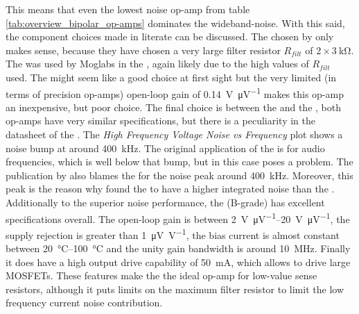This means that even the lowest noise op-amp from table \ref{tab:overview_bipolar_op-amps} dominates the wideband-noise. With this said, the component choices made in literate can be discussed. The  chosen by \citeauthor{laser_driver_digital} \cite{laser_driver_digital} only makes sense, because they have chosen a very large filter resistor $R_{filt}$ of $2 \times \qty{3}{\kilo\ohm}$. The  was used by Moglabs in the , again likely due to the high values of $R_{filt}$ used. The  might seem like a good choice at first sight but the very limited (in terms of precision op-amps) open-loop gain of \qty{0.14}{\V \per \uV} makes this op-amp an inexpensive, but poor choice. The final choice is between the  and the , both op-amps have very similar specifications, but there is a peculiarity in the datasheet of the  \cite{datasheet_LT1028}. The \textit{High Frequency Voltage Noise
vs Frequency} plot shows a noise bump at around \qty{400}{\kHz}. The original application of the  is for audio frequencies, which is well below that bump, but in this case poses a problem. The publication by \citeauthor{libbrecht_hall} \cite{libbrecht_hall} also blames the  for the noise peak around \qty{400}{\kHz}. Moreover, this peak is the reason why \citeauthor{laser_driver_mosfet_noise} \cite{laser_driver_mosfet_noise} found the  to have a higher integrated noise than the . Additionally to the superior noise performance, the  (B-grade) has excellent specifications overall. The open-loop gain is between \qtyrange[range-units = single]{2}{20}{\V \per \uV}, the supply rejection is greater than \qty{1}{\uV \per \V}, the bias current is almost constant between \qtyrange[range-units = single]{20}{100}{\celsius} and the unity gain bandwidth is around \qty{10}{\MHz}. Finally it does have a high output drive capability of \qty{50}{\mA}, which allows to drive large MOSFETs. These features make the  the ideal op-amp for low-value sense resistors, although it puts limits on the maximum filter resistor to limit the low frequency current noise contribution.

